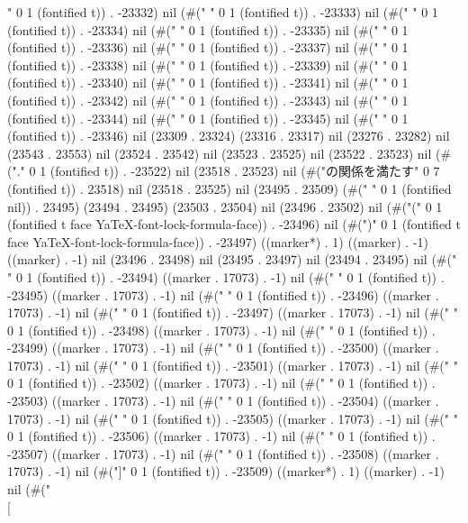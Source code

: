 {" 0 1 (fontified t)) . -23332) nil (#(" " 0 1 (fontified t)) . -23333) nil (#(" " 0 1 (fontified t)) . -23334) nil (#(" " 0 1 (fontified t)) . -23335) nil (#(" " 0 1 (fontified t)) . -23336) nil (#(" " 0 1 (fontified t)) . -23337) nil (#(" " 0 1 (fontified t)) . -23338) nil (#(" " 0 1 (fontified t)) . -23339) nil (#(" " 0 1 (fontified t)) . -23340) nil (#(" " 0 1 (fontified t)) . -23341) nil (#(" " 0 1 (fontified t)) . -23342) nil (#(" " 0 1 (fontified t)) . -23343) nil (#(" " 0 1 (fontified t)) . -23344) nil (#(" " 0 1 (fontified t)) . -23345) nil (#(" " 0 1 (fontified t)) . -23346) nil (23309 . 23324) (23316 . 23317) nil (23276 . 23282) nil (23543 . 23553) nil (23524 . 23542) nil (23523 . 23525) nil (23522 . 23523) nil (#("." 0 1 (fontified t)) . -23522) nil (23518 . 23523) nil (#("の関係を満たす" 0 7 (fontified t)) . 23518) nil (23518 . 23525) nil (23495 . 23509) (#(" " 0 1 (fontified nil)) . 23495) (23494 . 23495) (23503 . 23504) nil (23496 . 23502) nil (#("(" 0 1 (fontified t face YaTeX-font-lock-formula-face)) . -23496) nil (#(")" 0 1 (fontified t face YaTeX-font-lock-formula-face)) . -23497) ((marker*) . 1) ((marker) . -1) ((marker) . -1) nil (23496 . 23498) nil (23495 . 23497) nil (23494 . 23495) nil (#("
" 0 1 (fontified t)) . -23494) ((marker . 17073) . -1) nil (#(" " 0 1 (fontified t)) . -23495) ((marker . 17073) . -1) nil (#(" " 0 1 (fontified t)) . -23496) ((marker . 17073) . -1) nil (#(" " 0 1 (fontified t)) . -23497) ((marker . 17073) . -1) nil (#(" " 0 1 (fontified t)) . -23498) ((marker . 17073) . -1) nil (#(" " 0 1 (fontified t)) . -23499) ((marker . 17073) . -1) nil (#(" " 0 1 (fontified t)) . -23500) ((marker . 17073) . -1) nil (#(" " 0 1 (fontified t)) . -23501) ((marker . 17073) . -1) nil (#(" " 0 1 (fontified t)) . -23502) ((marker . 17073) . -1) nil (#(" " 0 1 (fontified t)) . -23503) ((marker . 17073) . -1) nil (#(" " 0 1 (fontified t)) . -23504) ((marker . 17073) . -1) nil (#(" " 0 1 (fontified t)) . -23505) ((marker . 17073) . -1) nil (#(" " 0 1 (fontified t)) . -23506) ((marker . 17073) . -1) nil (#(" " 0 1 (fontified t)) . -23507) ((marker . 17073) . -1) nil (#(" " 0 1 (fontified t)) . -23508) ((marker . 17073) . -1) nil (#("]" 0 1 (fontified t)) . -23509) ((marker*) . 1) ((marker) . -1) nil (#("\\[
          
}
